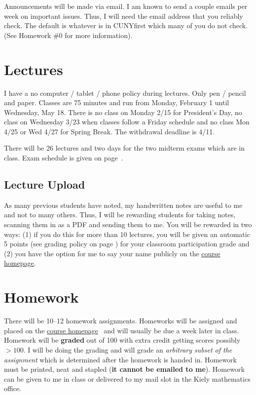 \documentclass[12pt]{article}
\newcommand{\coursewebpage}{\href{https://github.com/kapelner/QC_Math_390.03-02_Spr_2016}{course homepage}}
\begin{document}
Announcements will be made via email. I am known to send a couple emails per week on important issues. Thus, I will need the email address that you reliably check. The default is whatever is in CUNYfirst which many of you do not check. (See Homework \#0 for more information).

\section*{Lectures}

I have a no computer / tablet / phone policy during lectures. Only pen / pencil and paper. Classes are 75 minutes and run from Monday, February 1 until Wednesday, May 18. There is no class on Monday 2/15 for President's Day, no class on Wednesday 3/23 when classes follow a Friday schedule and no class Mon 4/25 or Wed 4/27 for Spring Break. The withdrawal deadline is 4/11.

There will be 26 lectures and two days for the two midterm exams which are in class. Exam schedule is given on page~\pageref{subsec:exam_schedule}.

\subsection*{Lecture Upload}

As many previous students have noted, my handwritten notes are useful to me and not to many others. Thus, I will be rewarding students for taking notes, scanning them in as a PDF and sending them to me. You will be rewarded in two ways: (1) if you do this for more than 10 lectures, you will be given an automatic 5 points (see grading policy on page \pageref{sec:grading}) for your classroom participation grade and (2) you have the option for me to say your name publicly on the \coursewebpage.

\section*{Homework}

There will be 10--12 homework assignments. Homeworks will be assigned and placed on the \coursewebpage~ and will usually be due a week later in class. Homework will be \textbf{graded} out of 100 with extra credit getting scores possibly $> 100$. I will be doing the grading and will grade an \textit{arbitrary subset of the assignment} which is determined after the homework is handed in. Homework must be printed, neat and stapled (\textbf{it cannot be emailed to me}). Homework can be given to me in class or delivered to my mail slot in the Kiely mathematics office.
\end{document}
